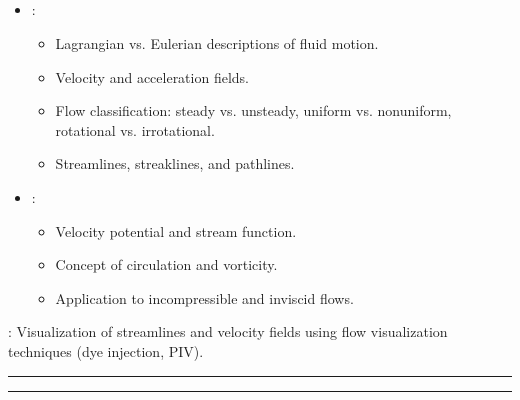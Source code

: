 \documentclass[letterpaper,10pt,english]{jupyterBook}
\begin{document}
\subsection{}
\label{\detokenize{syllabus:weeks-5-6-fluid-kinematics-description-of-fluid-motion}}\begin{itemize}
\item {} 
\sphinxAtStartPar
{}:
\begin{itemize}
\item {} 
\sphinxAtStartPar
Lagrangian vs. Eulerian descriptions of fluid motion.

\item {} 
\sphinxAtStartPar
Velocity and acceleration fields.

\item {} 
\sphinxAtStartPar
Flow classification: steady vs. unsteady, uniform vs. non\sphinxhyphen{}uniform, rotational vs. irrotational.

\item {} 
\sphinxAtStartPar
Streamlines, streaklines, and pathlines.

\end{itemize}

\item {} 
\sphinxAtStartPar
{}:
\begin{itemize}
\item {} 
\sphinxAtStartPar
Velocity potential and stream function.

\item {} 
\sphinxAtStartPar
Concept of circulation and vorticity.

\item {} 
\sphinxAtStartPar
Application to incompressible and inviscid flows.

\end{itemize}

\end{itemize}

\sphinxAtStartPar
{}: Visualization of streamlines and velocity fields using flow visualization techniques (dye injection, PIV).


\bigskip\hrule\bigskip



\bigskip\hrule\bigskip
\end{document}
